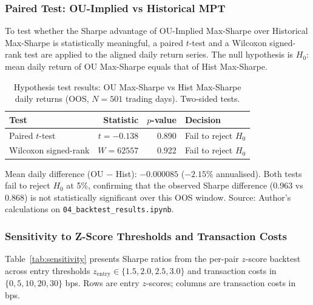 \documentclass[a4paper]{report}
\begin{document}
\FloatBarrier

\subsubsection{Paired Test: OU-Implied vs Historical MPT}

To test whether the Sharpe advantage of OU-Implied Max-Sharpe over Historical Max-Sharpe
is statistically meaningful, a paired $t$-test and a Wilcoxon signed-rank test are applied
to the aligned daily return series. The null hypothesis is $H_0$: mean daily return
of OU Max-Sharpe equals that of Hist Max-Sharpe.

\begin{table}[htbp]
\centering
\caption{Hypothesis test results: OU Max-Sharpe vs Hist Max-Sharpe daily returns
(OOS, $N = 501$ trading days). Two-sided tests.\\}
\label{tab:paired_test}
\begin{tabular}{lrrl}
\toprule
Test & Statistic & $p$-value & Decision \\
\midrule
Paired $t$-test         & $t = -0.138$ & 0.890 & Fail to reject $H_0$ \\
Wilcoxon signed-rank    & $W = 62557$ & 0.922 & Fail to reject $H_0$ \\
\bottomrule
\end{tabular}
\par\smallskip
\begin{minipage}{\linewidth}
\small
Mean daily difference (OU $-$ Hist): $-0.000085$ ($-2.15\%$ annualised).
Both tests fail to reject $H_0$ at 5\%, confirming that the observed Sharpe difference (0.963 vs 0.868) is not statistically significant over this OOS window.
Source: Author's calculations on \texttt{04\_backtest\_results.ipynb}.
\end{minipage}
\end{table}

\FloatBarrier

\subsubsection{Sensitivity to Z-Score Thresholds and Transaction Costs}

Table~\ref{tab:sensitivity} presents Sharpe ratios from the per-pair $z$-score backtest
across entry thresholds $z_{\text{entry}} \in \{1.5, 2.0, 2.5, 3.0\}$ and transaction
costs in $\{0, 5, 10, 20, 30\}$ bps. Rows are entry $z$-scores; columns are transaction costs in bps.
\end{document}
